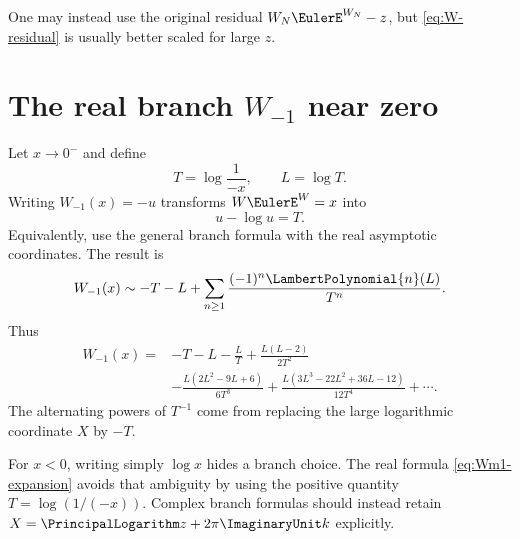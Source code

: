 \documentclass[11pt,openany]{book}
\theoremstyle{definition}
\theoremstyle{plain}
\theoremstyle{remark}
\begin{document}
One may instead use the original residual \(W_N\EulerE^{W_N}-z\), but
\cref{eq:W-residual} is usually better scaled for large \(z\).

\section{The real branch \texorpdfstring{\(W_{-1}\)}{W-1} near zero}
Let \(x\to0^-\) and define
\begin{equation}\label{eq:Wm1-TL}
 T=\log\frac1{-x},
 \qquad L=\log T.
\end{equation}
Writing \(W_{-1}(x)=-u\) transforms
\(W\EulerE^W=x\) into
\[
 u-\log u=T.
\]
Equivalently, use the general branch formula with the real asymptotic
coordinates.  The result is
\begin{equation}\label{eq:Wm1-expansion}
 W_{-1}(x)
 \sim -T-L+\sum_{n\ge1}\frac{(-1)^n\LambertPolynomial{n}(L)}{T^n}.
\end{equation}
Thus
\begin{equation}\label{eq:Wm1-first}
\begin{split}
 W_{-1}(x)={}&-T-L-\frac{L}{T}
 +\frac{L(L-2)}{2T^2}\\
 &-\frac{L(2L^2-9L+6)}{6T^3}
 +\frac{L(3L^3-22L^2+36L-12)}{12T^4}+\cdots.
\end{split}
\end{equation}
The alternating powers of \(T^{-1}\) come from replacing the large logarithmic
coordinate \(X\) by \(-T\).

\begin{warningbox}
For \(x<0\), writing simply \(\log x\) hides a branch choice.  The real formula
\cref{eq:Wm1-expansion} avoids that ambiguity by using the positive quantity
\(T=\log(1/(-x))\).  Complex branch formulas should instead retain
\(X=\PrincipalLogarithm z+2\pi\ImaginaryUnit k\) explicitly.
\end{warningbox}
\end{document}

